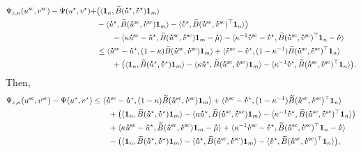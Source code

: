 \begin{align*}
\Psi_{\varepsilon, \kappa} (u^{\text{sc}} ,v^{\text{sc}}) -\Psi(u^\star, v^\star)
+& \big( \inr{\mathbf 1_n, \widetilde{B}(\dt{u}^{\star} ,\dt{v}^{\star})\mathbf 1_m} \\
&- \inr{\dt{u}^{\star{}}, \widetilde{B}(\dt{u}^{\text{sc}} ,\dt{v}^{\text{sc}})\mathbf 1_m} 
- \inr{\dt{v}^\star, \widetilde{B}(\dt{u}^{\text{sc}} ,\dt{v}^{\text{sc}})^\top\mathbf 1_n} \big)\\
& \qquad -\inr{\kappa \dt{u}^{\text{sc}} - \dt{u}^{\star}, \widetilde{B}(\dt{u}^{\text{sc}} ,\dt{v}^{\text{sc}})\mathbf 1_m - \dt{\mu}} -\inr{\kappa^{-1}\dt{v}^{\text{sc}} - \dt{v}^{\star}, \widetilde{B}(\dt{u}^{\text{sc}} ,\dt{v}^{\text{sc}})^\top\mathbf 1_n - \dt{\nu}}\\
& \leq \inr{\dt{u}^{\text{sc}} - \dt{u}^\star, (1-\kappa) \widetilde{B}(\dt{u}^{\text{sc}} ,\dt{v}^{\text{sc}})\mathbf 1_m} 
+ \inr{\dt{v}^{\text{sc}} - \dt{v}^\star, (1-\kappa^{-1}) \widetilde{B}(\dt{u}^{\text{sc}} ,\dt{v}^{\text{sc}})^\top\mathbf 1_n}\\
&\qquad + \big(\inr{\mathbf 1_n, \widetilde{B}(\dt{u}^{\star} ,\dt{v}^{\star})\mathbf 1_m}  
- \inr{\kappa\dt{u}^{\star{}}, \widetilde{B}(\dt{u}^{\text{sc}} ,\dt{v}^{\text{sc}})\mathbf 1_m} 
- \inr{\kappa^{-1}\dt{v}^\star, \widetilde{B}(\dt{u}^{\text{sc}} ,\dt{v}^{\text{sc}})^\top\mathbf 1_n} \big).
\end{align*}
Then,
\begin{align*}
\Psi_{\varepsilon, \kappa} (u^{\text{sc}} ,v^{\text{sc}}) -\Psi(u^\star, v^\star)
&\leq \inr{\dt{u}^{\text{sc}} - \dt{u}^\star, (1-\kappa) \widetilde{B}(\dt{u}^{\text{sc}} ,\dt{v}^{\text{sc}})\mathbf 1_m} 
+ \inr{\dt{v}^{\text{sc}} - \dt{v}^\star, (1-\kappa^{-1}) \widetilde{B}(\dt{u}^{\text{sc}} ,\dt{v}^{\text{sc}})^\top\mathbf 1_n}\\
&\qquad + \big(\inr{\mathbf 1_n, \widetilde{B}(\dt{u}^{\star} ,\dt{v}^{\star})\mathbf 1_m}  
- \inr{\kappa\dt{u}^{\star{}}, \widetilde{B}(\dt{u}^{\text{sc}} ,\dt{v}^{\text{sc}})\mathbf 1_m} 
- \inr{\kappa^{-1}\dt{v}^\star, \widetilde{B}(\dt{u}^{\text{sc}} ,\dt{v}^{\text{sc}})^\top\mathbf 1_n} \big)
\\
&\qquad + \inr{\kappa \dt{u}^{\text{sc}} - \dt{u}^{\star}, \widetilde{B}(\dt{u}^{\text{sc}} ,\dt{v}^{\text{sc}})\mathbf 1_m - \dt{\mu}} + \inr{\kappa^{-1}\dt{v}^{\text{sc}} - \dt{v}^{\star}, \widetilde{B}(\dt{u}^{\text{sc}} ,\dt{v}^{\text{sc}})^\top\mathbf 1_n - \dt{\nu}}\\
&\qquad - \big(\inr{\mathbf 1_n, \widetilde{B}(\dt{u}^{\star} ,\dt{v}^{\star})\mathbf 1_m}  
- \inr{\dt{u}^{\star{}}, \widetilde{B}(\dt{u}^{\text{sc}} ,\dt{v}^{\text{sc}})\mathbf 1_m} 
- \inr{\dt{v}^\star, \widetilde{B}(\dt{u}^{\text{sc}} ,\dt{v}^{\text{sc}})^\top \mathbf 1_n} \big),
\end{align*}
